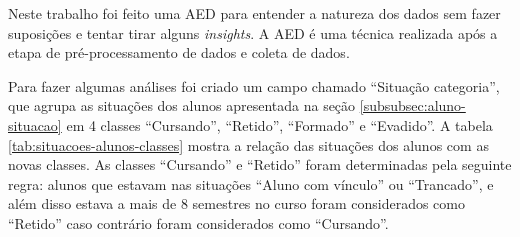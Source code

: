 \documentclass[diss,capa]{texufpel}
\begin{document}
% 


Neste trabalho foi feito uma AED para entender a natureza dos dados sem fazer suposições e tentar tirar alguns \textit{insights}.
A AED é uma técnica realizada após a etapa de pré-processamento de dados e coleta de dados.

Para fazer algumas análises foi criado um campo chamado ``Situação categoria'', que agrupa as situações dos alunos apresentada na seção \ref{subsubsec:aluno-situacao} em 4 classes ``Cursando'', ``Retido'', ``Formado'' e ``Evadido''.
A tabela \ref{tab:situacoes-alunos-classes} mostra a relação das situações dos alunos com as novas classes. As classes ``Cursando'' e ``Retido'' foram determinadas pela seguinte regra: alunos que estavam nas situações ``Aluno com vínculo'' ou ``Trancado'', e além disso estava a mais de 8 semestres no curso foram considerados como ``Retido'' caso contrário foram considerados como ``Cursando''.
\end{document}
